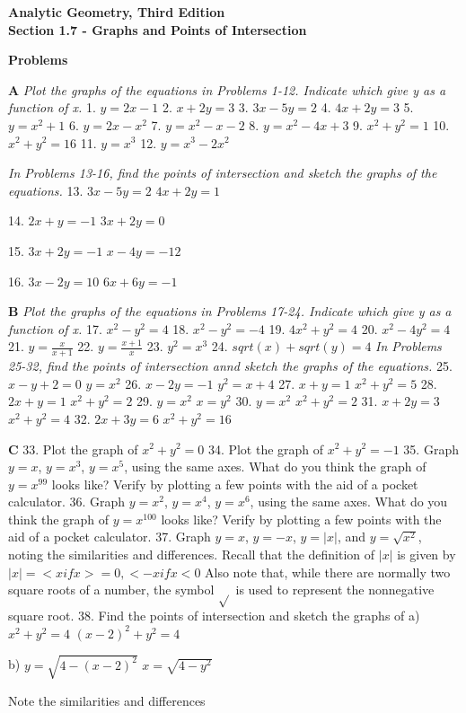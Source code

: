 \documentclass[10pt,letterpaper]{article}
\begin{document}
\textbf{Analytic Geometry, Third Edition}\\

\textbf{Section 1.7 - Graphs and Points of Intersection}

\textbf{Problems}

\textbf{A} \textit{Plot the graphs of the equations in Problems 1-12. Indicate which give y as a function of x.}
1. $y=2x-1$
2. $x+2y=3$
3. $3x-5y=2$
4. $4x+2y=3$
5. $y=x^2+1$
6. $y=2x-x^2$
7. $y=x^2-x-2$
8. $y=x^2-4x +3$
9. $x^2+y^2=1$
10. $x^2+y^2=16$
11. $y=x^3$
12. $y=x^3-2x^2$

\textit{In Problems 13-16, find the points of intersection and sketch the graphs of the equations.}
13. $3x-5y=2$
$4x+2y=1$

14. $2x+y=-1$
$3x+2y=0$

15. $3x+2y=-1$
$x-4y=-12$

16. $3x-2y=10$
$6x+6y=-1$

\textbf{B} \textit{Plot the graphs of the equations in Problems 17-24. Indicate which give y as a function of x.}
17. $x^2-y^2=4$
18. $x^2-y^2=-4$
19. $4x^2+y^2=4$
20. $x^2-4y^2 =4$
21. $y=\frac{x}{x+1}$
22. $y=\frac{x+1}{x}$
23. $y^2=x^3$
24. $sqrt(x)+sqrt(y)=4$
\textit{In Problems 25-32, find the points of intersection annd sketch the graphs of the equations.}
25.$x-y+2=0$
$y=x^2$
26.
$x- 2y=-1$
$y^2=x+ 4$
27.
$x+ y=1$
$x^2+y^2=5$
28.
$2x+ y=1$
$x^2+y^2=2$
29.
$y=x^2$
$x= y^2$
30.
$y=x^2$
$x^2+y^2=2$
31.
$x+ 2y=3$
$x^2+y^2=4$
32.
$2x+3y=6$
$x^2+y^2=16$

\textbf{C}
33. Plot the graph of $x^2+y^2=0$
34. Plot the graph of $x^2+y^2=-1$
35. Graph $y=x$, $y=x^3$, $y=x^5$, using the same axes. What do you think the graph of $y= x^{99}$ looks like? Verify by plotting a few points with the aid of a pocket calculator. 
36. Graph $y=x^2$, $y=x^4$, $y=x^6$, using the same axes. What do you think the graph of $y=x^{100}$ looks like? Verify by plotting a few points with the aid of a pocket calculator. 
37. Graph $y=x$, $y=-x$, $y=|x|$, and $y=\sqrt{x^2}$, noting the similarities and differences. Recall that the definition of $|x|$ is given by
$ |x|=< x if x >= 0, <-x if x < 0$
Also note that, while there are normally two square roots of a number, the symbol $\sqrt{}$ is used to represent the nonnegative square root.
38. Find the points of intersection and sketch the graphs of
a) $x^2+y^2 =4$
    $(x-2)^2+y^2=4$

b) $y=\sqrt{4-(x-2)^2}$
    $x=\sqrt{4-y^2}$

Note the similarities and differences
\end{document}

